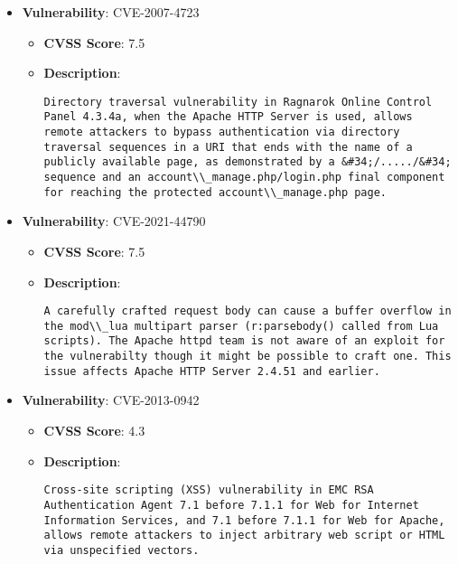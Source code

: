 \documentclass{article}
\begin{document}
\begin{itemize}
        \item \textbf{Vulnerability}: CVE-2007-4723
        \begin{itemize}
            \item \textbf{CVSS Score}:  7.5 
            \item \textbf{Description}:
            \parbox[t]{0.9\linewidth}{
                \verb|Directory traversal vulnerability in Ragnarok Online Control Panel 4.3.4a, when the Apache HTTP Server is used, allows remote attackers to bypass authentication via directory traversal sequences in a URI that ends with the name of a publicly available page, as demonstrated by a &#34;/...../&#34; sequence and an account\\_manage.php/login.php final component for reaching the protected account\\_manage.php page.|
            }
        \end{itemize}
    
        \item \textbf{Vulnerability}: CVE-2021-44790
        \begin{itemize}
            \item \textbf{CVSS Score}:  7.5 
            \item \textbf{Description}:
            \parbox[t]{0.9\linewidth}{
                \verb|A carefully crafted request body can cause a buffer overflow in the mod\\_lua multipart parser (r:parsebody() called from Lua scripts). The Apache httpd team is not aware of an exploit for the vulnerabilty though it might be possible to craft one. This issue affects Apache HTTP Server 2.4.51 and earlier.|
            }
        \end{itemize}
    
        \item \textbf{Vulnerability}: CVE-2013-0942
        \begin{itemize}
            \item \textbf{CVSS Score}:  4.3 
            \item \textbf{Description}:
            \parbox[t]{0.9\linewidth}{
                \verb|Cross-site scripting (XSS) vulnerability in EMC RSA Authentication Agent 7.1 before 7.1.1 for Web for Internet Information Services, and 7.1 before 7.1.1 for Web for Apache, allows remote attackers to inject arbitrary web script or HTML via unspecified vectors.|
            }
        \end{itemize}
    

\end{itemize}
\end{document}
